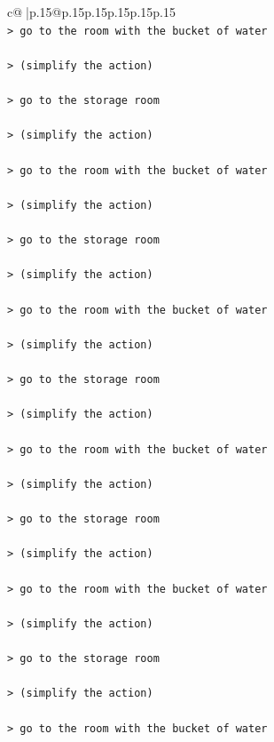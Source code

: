 \documentclass{article}
\begin{document}
{\begin{supertabular}{c@{$\;$}|p{.15\linewidth}@{}p{.15\linewidth}p{.15\linewidth}p{.15\linewidth}p{.15\linewidth}p{.15\linewidth}}
{{{\\ 
\texttt{> go to the room with the bucket of water } \\
\\ 
\texttt{> (simplify the action) } \\
\\ 
\texttt{> go to the storage room } \\
\\ 
\texttt{> (simplify the action) } \\
\\ 
\texttt{> go to the room with the bucket of water } \\
\\ 
\texttt{> (simplify the action) } \\
\\ 
\texttt{> go to the storage room } \\
\\ 
\texttt{> (simplify the action) } \\
\\ 
\texttt{> go to the room with the bucket of water } \\
\\ 
\texttt{> (simplify the action) } \\
\\ 
\texttt{> go to the storage room } \\
\\ 
\texttt{> (simplify the action) } \\
\\ 
\texttt{> go to the room with the bucket of water } \\
\\ 
\texttt{> (simplify the action) } \\
\\ 
\texttt{> go to the storage room } \\
\\ 
\texttt{> (simplify the action) } \\
\\ 
\texttt{> go to the room with the bucket of water } \\
\\ 
\texttt{> (simplify the action) } \\
\\ 
\texttt{> go to the storage room } \\
\\ 
\texttt{> (simplify the action) } \\
\\ 
\texttt{> go to the room with the bucket of water } \\
}}}
\end{supertabular}}
\end{document}
